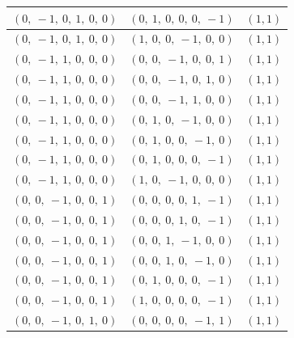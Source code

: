 \documentclass[11pt]{article}
\theoremstyle{definition}
\begin{document}
\begin{center}
\begin{tabular}{|l|l|c|}
    \hline
    $\left( 0, \  -1, \  0, \  1, \  0, \  0\right)$ & $\left( 0, \  1, \  0, \  0, \  0, \  -1\right)$ & $(1,1)$ \\
    \hline
    $\left( 0, \  -1, \  0, \  1, \  0, \  0\right)$ & $\left( 1, \  0, \  0, \  -1, \  0, \  0\right)$ & $(1,1)$ \\
    \hline
    $\left( 0, \  -1, \  1, \  0, \  0, \  0\right)$ & $\left( 0, \  0, \  -1, \  0, \  0, \  1\right)$ & $(1,1)$ \\
    \hline
    $\left( 0, \  -1, \  1, \  0, \  0, \  0\right)$ & $\left( 0, \  0, \  -1, \  0, \  1, \  0\right)$ & $(1,1)$ \\
    \hline
    $\left( 0, \  -1, \  1, \  0, \  0, \  0\right)$ & $\left( 0, \  0, \  -1, \  1, \  0, \  0\right)$ & $(1,1)$ \\
    \hline
    $\left( 0, \  -1, \  1, \  0, \  0, \  0\right)$ & $\left( 0, \  1, \  0, \  -1, \  0, \  0\right)$ & $(1,1)$ \\
    \hline
    $\left( 0, \  -1, \  1, \  0, \  0, \  0\right)$ & $\left( 0, \  1, \  0, \  0, \  -1, \  0\right)$ & $(1,1)$ \\
    \hline
    $\left( 0, \  -1, \  1, \  0, \  0, \  0\right)$ & $\left( 0, \  1, \  0, \  0, \  0, \  -1\right)$ & $(1,1)$ \\
    \hline
    $\left( 0, \  -1, \  1, \  0, \  0, \  0\right)$ & $\left( 1, \  0, \  -1, \  0, \  0, \  0\right)$ & $(1,1)$ \\
    \hline
    $\left( 0, \  0, \  -1, \  0, \  0, \  1\right)$ & $\left( 0, \  0, \  0, \  0, \  1, \  -1\right)$ & $(1,1)$ \\
    \hline
    $\left( 0, \  0, \  -1, \  0, \  0, \  1\right)$ & $\left( 0, \  0, \  0, \  1, \  0, \  -1\right)$ & $(1,1)$ \\
    \hline
    $\left( 0, \  0, \  -1, \  0, \  0, \  1\right)$ & $\left( 0, \  0, \  1, \  -1, \  0, \  0\right)$ & $(1,1)$ \\
    \hline
    $\left( 0, \  0, \  -1, \  0, \  0, \  1\right)$ & $\left( 0, \  0, \  1, \  0, \  -1, \  0\right)$ & $(1,1)$ \\
    \hline
    $\left( 0, \  0, \  -1, \  0, \  0, \  1\right)$ & $\left( 0, \  1, \  0, \  0, \  0, \  -1\right)$ & $(1,1)$ \\
    \hline
    $\left( 0, \  0, \  -1, \  0, \  0, \  1\right)$ & $\left( 1, \  0, \  0, \  0, \  0, \  -1\right)$ & $(1,1)$ \\
    \hline
    $\left( 0, \  0, \  -1, \  0, \  1, \  0\right)$ & $\left( 0, \  0, \  0, \  0, \  -1, \  1\right)$ & $(1,1)$ \\

\end{tabular}
\end{center}
\end{document}
